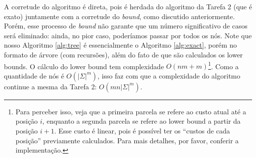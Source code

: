 A corretude do algoritmo é direta, pois é herdada do algoritmo da Tarefa 2 (que é exato) juntamente com a corretude do \textit{bound}, como discutido anteriormente. Porém, esse processo de \textit{bound} não garante que um número significativo de casos será eliminado: ainda, no pior caso, poderíamos passar por todos os nós.
Note que nosso Algoritmo \ref{alg:tree} é essencialmente o Algoritmo \ref{alg:exact}, porém no formato de árvore (com recursões), além do fato de que são calculados os lower bounds. O cálculo do lower bound tem complexidade $O(nm + m)$\footnote{Para perceber isso, veja que a primeira parcela se refere ao custo atual até a posição $i$, enquanto a segunda parcela se refere ao lower bound a partir da posição $i+1$. Esse custo é linear, pois é possível ter os ``custos de cada posição'' previamente calculados. Para mais detalhes, por favor, conferir a implementação.}.
Como a quantidade de nós é $O(|\Sigma|^m)$, isso faz com que a complexidade do algoritmo continue a mesma da Tarefa 2: $O(mn|\Sigma|^m)$.
